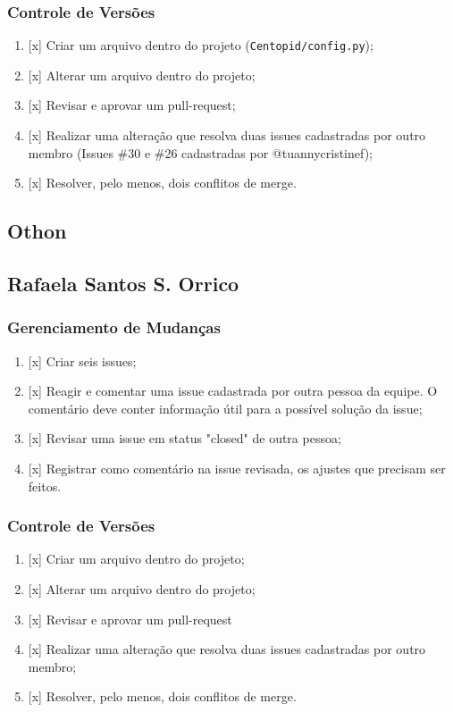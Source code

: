 \documentclass[12pt]{article}
\begin{document}
    \subsubsection{Controle de Versões}
        \begin{enumerate}
            \item {[x] Criar um arquivo dentro do projeto (\texttt{Centopid/config.py});} 
            \item {[x] Alterar um arquivo dentro do projeto;}
            \item {[x] Revisar e aprovar um pull-request;}
            \item {[x] Realizar uma alteração que resolva duas issues cadastradas por outro membro (Issues \#30 e \#26 cadastradas por @tuannycristinef);}
            \item {[x] Resolver, pelo menos, dois conflitos de merge.}
        \end{enumerate}
\subsection{Othon}

\subsection{Rafaela Santos S. Orrico}
\subsubsection{Gerenciamento de Mudanças}
    \begin{enumerate}
        \item {[x] Criar seis issues;}
        \item {[x] Reagir e comentar uma issue cadastrada por outra pessoa da equipe. O comentário deve conter informação útil para a possível solução da issue;}
        \item {[x] Revisar uma issue em status "closed" de outra pessoa;}
        \item {[x] Registrar como comentário na issue revisada, os ajustes que precisam ser feitos.}
    \end{enumerate}
     
\subsubsection{Controle de Versões}
    \begin{enumerate}
        \item {[x] Criar um arquivo dentro do projeto;}
        \item {[x] Alterar um arquivo dentro do projeto;}
        \item {[x] Revisar e aprovar um pull-request}
        \item {[x] Realizar uma alteração que resolva duas issues cadastradas por outro membro;}
        \item {[x] Resolver, pelo menos, dois conflitos de merge.}
    \end{enumerate}
\end{document}
